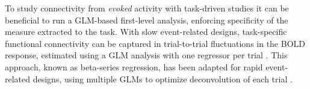 \documentclass[5p]{elsarticle}
\begin{document}
To study connectivity from \emph{evoked} activity with task-driven studies it
can be beneficial to run a GLM-based first-level analysis, enforcing specificity
of the measure extracted to the task. With slow event-related designs,
task-specific functional connectivity can be captured in trial-to-trial
fluctuations in the BOLD response, estimated using a GLM analysis with one
regressor per trial \cite{grillon2012,rissman2004,mennes2010}. This approach,
known as beta-series regression, has been adapted for rapid event-related
designs, using multiple GLMs to optimize deconvolution of each trial
\cite{mumford2012}.


\end{document}
